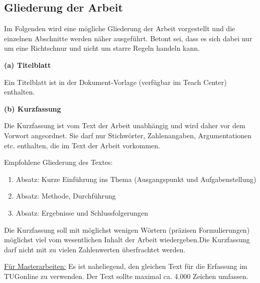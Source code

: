 


\newpage


\subsection{Gliederung der Arbeit}

Im Folgenden wird eine mögliche Gliederung der Arbeit vorgestellt und die einzelnen Abschnitte werden näher ausgeführt. Betont sei, dass es sich dabei nur um eine Richtschnur und nicht um starre Regeln handeln kann. 

\vspace{1mm}

\textbf{(a) Titelblatt}

\vspace{1mm}

Ein Titelblatt ist in der Dokument-Vorlage (verfügbar im Teach Center) enthalten.

\vspace{1,5mm}


\textbf{(b) Kurzfassung}

\vspace{1mm}

Die Kurzfassung ist vom Text der Arbeit unabhängig und wird daher vor dem Vorwort angeordnet. Sie darf nur Stichwörter, Zahlenangaben, Argumentationen etc. enthalten, die im Text der Arbeit vorkommen.

\vspace{1mm}

Empfohlene Gliederung des Textes:
\begin{enumerate}
    \item Absatz: Kurze Einführung ins Thema (Ausgangspunkt und Aufgabenstellung)
    \item Absatz: Methode, Durchführung
    \item Absatz: Ergebnisse und Schlussfolgerungen
\end{enumerate}

Die Kurzfassung soll mit möglichst wenigen Wörtern (präzisen Formulierungen) möglichst viel vom wesentlichen Inhalt der Arbeit wiedergeben.Die Kurzfassung darf nicht mit zu vielen Zahlenwerten überfrachtet werden. 

\vspace{1mm}

\underline{Für Masterarbeiten:} Es ist naheliegend, den gleichen Text für die Erfassung im TUGonline zu verwenden. Der Text sollte maximal ca. 4.000 Zeichen umfassen.


